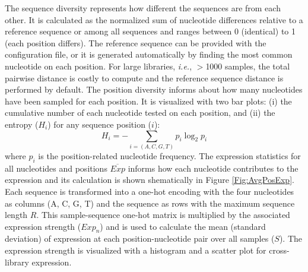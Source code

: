 \documentclass[utf8]{frontiersSCNS} %
\begin{document}
The sequence diversity represents how different the sequences are from each other. It is calculated as the normalized sum of nucleotide differences relative to a reference sequence or among all sequences and ranges between 0 (identical) to 1 (each position differs). The reference sequence can be provided with the configuration file, or it is generated automatically by finding the most common nucleotide on each position. For large libraries, \textit{i.e.}, $>$1000 samples, the total pairwise distance is costly to compute and the reference sequence distance is performed by default. The position diversity informs about how many nucleotides have been sampled for each position. It is visualized with two bar plots: (i) the cumulative number of each nucleotide tested on each position, and (ii) the entropy ($H_i$) for any sequence position ($i$):
\begin{equation}
H_i = -\sum_{i=(A,C,G,T)} p_i \log_2 p_i\label{eq:01} %
\end{equation}
where $p_i$ is the position-related nucleotide frequency. The expression statistics for all nucleotides and positions $\overline{Exp}$ informs how each nucleotide contributes to the expression and its calculation is shown shematically in Figure \ref{Fig:AvgPosExp}.
Each sequence is transformed into a one-hot encoding with the four nucleotides as columns (A, C, G, T) and the sequence as rows with the maximum sequence length $R$. This sample-sequence one-hot matrix is multiplied by the associated expression strength ($Exp_n$) and is used to calculate the mean (standard deviation) of expression at each position-nucleotide pair over all samples ($S$). The expression strength is visualized with a histogram and a scatter plot for cross-library expression.  
\end{document}
